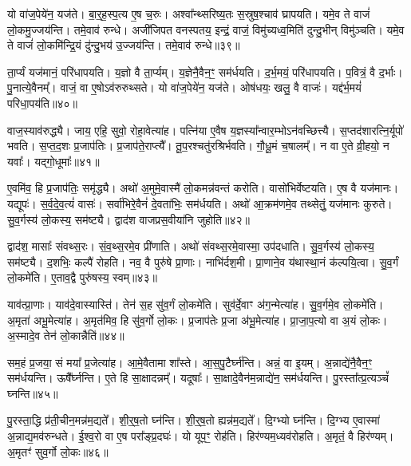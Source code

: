 यो वा॑ज॒पेये॑न॒ यज॑ते।
बा॒र्॒ह॒स्प॒त्य ए॒ष च॒रुः।
अश्वा᳚न्थ्सरिष्य॒तः स॒स्रुष॒श्चाव॑ घ्रापयति।
यमे॒व ते वाजं॑ लो॒कमु॒ज्जय॑न्ति।
तमे॒वाव॑ रुन्धे।
अजी॑जिपत वनस्पतय॒ इन्द्रं॒ वाजं॒ विमु॑च्यध्व॒मिति॑ दुन्दु॒भीन् विमु॑ञ्चति।
यमे॒व ते वाजं॑ लो॒कमि॑न्द्रि॒यं दु॑न्दु॒भय॑ उ॒ज्जय॑न्ति।
तमे॒वाव॑ रुन्धे॥३९॥\ip{}

ता॒र्प्यं यज॑मानं॒ परि॑धापयति।
य॒ज्ञो वै ता॒र्प्यम्।
य॒ज्ञेनै॒वैन॒ꣳ॒ सम॑र्धयति।
द॒र्भ॒मयं॒ परि॑धापयति।
प॒वित्रं॒ वै द॒र्भाः।
पु॒नात्ये॒वैनम्᳚।
वाजं॒ वा ए॒षो\-ऽव॑रुरुथ्सते।
यो वा॑ज॒पेये॑न॒ यज॑ते।
ओष॑धयः॒ खलु॒ वै वाजः॑।
यद्द॑र्भ॒मयं॑ परिधा॒पय॑ति॥४०॥\ip

वाज॒स्या\-व॑\-रुद्ध्यै।
जाय॒ एहि॒ सुवो॒ रोहा॒वेत्या॑ह।
पत्नि॑या ए॒वैष य॒ज्ञस्या᳚न्वार॒म्भो\-ऽन॑वच्छित्त्यै।
स॒प्तद॑शारत्नि॒र्यूपो॑ भवति।
स॒प्त॒द॒शः प्र॒जा\-प॑तिः।
प्र॒जा\-प॑ते॒राप्त्यै᳚।
तू॒प॒रश्चतु॑रश्रिर्भवति।
गौ॒धू॒मं च॒षालम्᳚।
न वा ए॒ते व्री॒हयो॒ न यवाः᳚।
यद्गो॒धूमाः᳚॥४१॥\ip

ए॒वमि॑व॒ हि प्र॒जा\-प॑तिः॒ समृ॑द्ध्यै।
अथो॑ अ॒मुमे॒वास्मै॑ लो॒कमन्न॑वन्तं करोति।
वासो॑भिर्वेष्टयति।
ए॒ष वै यज॑मानः।
यद्यूपः॑।
स॒र्व॒दे॒व॒त्यं॑ वासः॑।
सर्वा॑भिरे॒वैनं॑ दे॒वता॑भिः॒ सम॑र्धयति।
अथो॑ आ॒क्रम॑णमे॒व तथ्सेतुं॒ यज॑मानः कुरुते।
सु॒व॒र्गस्य॑ लो॒कस्य॒ सम॑ष्ट्यै।
द्वाद॑श वाजप्रस॒वीया॑नि जुहोति॥४२॥\ip

द्वाद॑श॒ मासाः᳚ संवथ्स॒रः।
सं॒व॒थ्स॒रमे॒व प्री॑णाति।
अथो॑ संवथ्स॒र\-मे॒वास्मा॒ उप॑दधाति।
सु॒व॒र्गस्य॑ लो॒कस्य॒ सम॑ष्ट्यै।
द॒शभिः॒ कल्पै॑ रोहति।
नव॒ वै पुरु॑षे प्रा॒णाः।
नाभि॑र्दश॒मी।
प्रा॒णाने॒व य॑था\-स्था॒नं क॑ल्पयि॒त्वा।
सु॒व॒र्गं लो॒कमे॑ति।
ए॒ताव॒द्वै पुरु॑षस्य॒ स्वम्॥४३॥\ip

याव॑त्प्रा॒णाः।
याव॑दे॒वास्यास्ति॑।
तेन॑ स॒ह सु॑व॒र्गं लो॒कमे॑ति।
सुव॑र्दे॒वाꣳ अ॑ग॒न्मेत्या॑ह।
सु॒व॒र्गमे॒व लो॒कमे॑ति।
अ॒मृता॑ अभू॒मेत्या॑ह।
अ॒मृत॑मिव॒ हि सु॑व॒र्गो लो॒कः।
प्र॒जा\-प॑तेः प्र॒जा अ॑भू॒मेत्या॑ह।
प्रा॒जा॒प॒त्यो वा अ॒यं लो॒कः।
अ॒स्मादे॒व तेन॑ लो॒कान्नैति॑॥४४॥\ip

सम॒हं प्र॒जया॒ सं मया᳚ प्र॒जेत्या॑ह।
आ॒\-मे॒वैतामा शा᳚स्ते।
आ॒स॒पु॒टैर्घ्न॑न्ति।
अन्नं॒ वा इ॒यम्।
अ॒न्नाद्ये॑नै॒वैन॒ꣳ॒ सम॑र्धयन्ति।
ऊषै᳚र्घ्नन्ति।
ए॒ते हि सा॒क्षादन्नम्᳚।
यदूषाः᳚।
सा॒क्षादे॒वैन॑म॒न्नाद्ये॑न॒ सम॑र्धयन्ति।
पु॒रस्ता᳚त्प्र॒त्यञ्चं᳚ घ्नन्ति॥४५॥\ip

पु॒रस्ता॒द्धि प्र॑ती॒चीन॒मन्न॑म॒द्यते᳚।
शी॒र्॒ष॒तो घ्न॑न्ति।
शी॒र्॒ष॒तो ह्यन्न॑म॒द्यते᳚।
दि॒ग्भ्यो घ्न॑न्ति।
दि॒ग्भ्य ए॒वास्मा॑ अ॒न्नाद्य॒मव॑रुन्धते।
ई॒श्व॒रो वा ए॒ष परा᳚ङ्प्र॒दघः॑।
यो यूप॒ꣳ॒ रोह॑ति।
हिर॑ण्यम॒ध्यव॑रोहति।
अ॒मृतं॒ वै हिर॑ण्यम्।
अ॒मृतꣳ॑ सुव॒र्गो लो॒कः॥४६॥\ip

